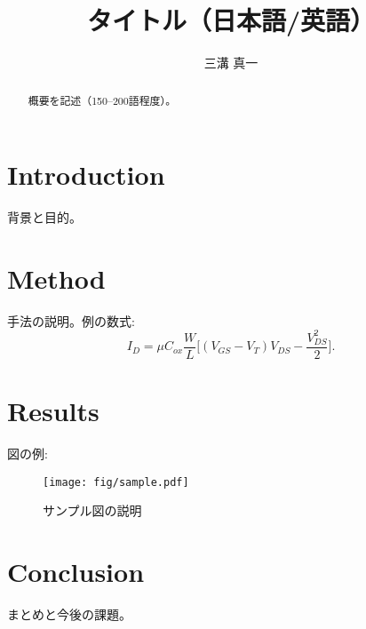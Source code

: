 \documentclass[conference]{IEEEtran}
\title{タイトル（日本語/英語）}
\author{三溝 真一}
\begin{document}
\maketitle

\begin{abstract}
概要を記述（150--200語程度）。
\end{abstract}

\section{Introduction}
背景と目的。

\section{Method}
手法の説明。例の数式:
\begin{equation}
I_D = \mu C_{ox} \frac{W}{L}\Big[(V_{GS}-V_T)V_{DS}-\frac{V_{DS}^2}{2}\Big].
\end{equation}

\section{Results}
図の例:
\begin{figure}[t]
  \centering
  \texttt{[image: fig/sample.pdf]}
  \caption{サンプル図の説明}
\end{figure}

\section{Conclusion}
まとめと今後の課題。



\end{document}
